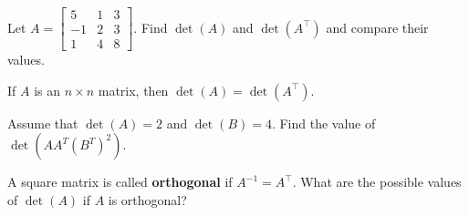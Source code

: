 \documentclass[20pt,a4paper]{extarticle}
\newcounter{example}
\newcounter{theorem}
\begin{document}
\begin{example}
Let $A = \begin{bmatrix} 5 & 1 & 3 \\ -1 & 2 & 3 \\ 1 & 4 & 8 \end{bmatrix}$. Find $\det (A)$ and $\det (A^\top)$ and compare their values.
\end{example}

\begin{solution}

\end{solution}

\vfill

\begin{theorem}
If $A$ is an $n \times n$ matrix, then $\det (A) = \det (A^\top)$. 
\end{theorem}

\vspace*{1cm}

\newpage 

\begin{example}
Assume that $\det (A) = 2$ and $\det (B) = 4$. Find the value of $\det (A A^T (B^T)^2)$.
\end{example}

\begin{solution}

\end{solution}

\vspace*{10cm}

\begin{example}
A square matrix is called \textbf{orthogonal} if $A^{-1} = A^\top$. What are the possible values of $\det (A)$ if $A$ is orthogonal?
\end{example}

\begin{solution}

\end{solution}
\end{document}
